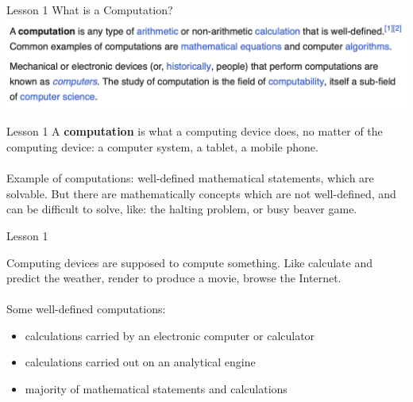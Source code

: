 \documentclass[aspectratio=1610]{beamer}
\begin{document}
\begin{frame}{Lesson 1}{}
{\Huge{What is a Computation?}}
\includegraphics[scale=0.58]{Images/computation.png}
\end{frame}




\begin{frame}{Lesson 1}{}
\Large
A \textbf{computation} is what a computing device does, no matter of the computing device: a computer system, a tablet, a mobile phone.\\~\\

Example of computations: well-defined mathematical statements, which are solvable. But there are mathematically concepts which are not well-defined, and can be difficult to solve, like: the halting problem, or busy beaver game.

\end{frame}


\begin{frame}{Lesson 1}{}

\Large
Computing devices are supposed to compute something. Like calculate and predict the weather, render to produce a movie, browse the Internet.   \\~\\ 
Some well-defined computations:

\begin{itemize}
    \item calculations carried by an electronic computer or calculator
    \item calculations carried out on an \alert{analytical engine}
    \item majority of mathematical statements and calculations
\end{itemize}
\end{frame}
\end{document}
